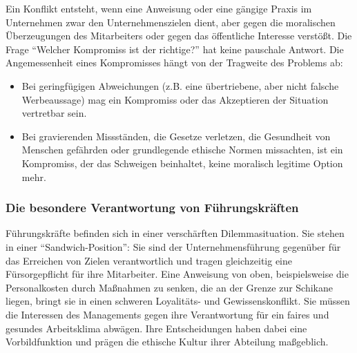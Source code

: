 \documentclass[
    12pt,               %
    a4paper,            %
    ngerman             %
]{scrartcl}
\begin{document}
Ein Konflikt entsteht, wenn eine Anweisung oder eine gängige Praxis im Unternehmen zwar den Unternehmenszielen dient, aber gegen die moralischen Überzeugungen des Mitarbeiters oder gegen das öffentliche Interesse verstößt. Die Frage \enquote{Welcher Kompromiss ist der richtige?} hat keine pauschale Antwort. Die Angemessenheit eines Kompromisses hängt von der Tragweite des Problems ab:
\begin{itemize}
    \item Bei geringfügigen Abweichungen (z.B. eine übertriebene, aber nicht falsche Werbeaussage) mag ein Kompromiss oder das Akzeptieren der Situation vertretbar sein.
    \item Bei gravierenden Missständen, die Gesetze verletzen, die Gesundheit von Menschen gefährden oder grundlegende ethische Normen missachten, ist ein Kompromiss, der das Schweigen beinhaltet, keine moralisch legitime Option mehr.
\end{itemize}

\subsubsection*{Die besondere Verantwortung von Führungskräften}
Führungskräfte befinden sich in einer verschärften Dilemmasituation. Sie stehen in einer \enquote{Sandwich-Position}: Sie sind der Unternehmensführung gegenüber für das Erreichen von Zielen verantwortlich und tragen gleichzeitig eine Fürsorgepflicht für ihre Mitarbeiter. Eine Anweisung von oben, beispielsweise die Personalkosten durch Maßnahmen zu senken, die an der Grenze zur Schikane liegen, bringt sie in einen schweren Loyalitäts- und Gewissenskonflikt. Sie müssen die Interessen des Managements gegen ihre Verantwortung für ein faires und gesundes Arbeitsklima abwägen. Ihre Entscheidungen haben dabei eine Vorbildfunktion und prägen die ethische Kultur ihrer Abteilung maßgeblich.
\end{document}

